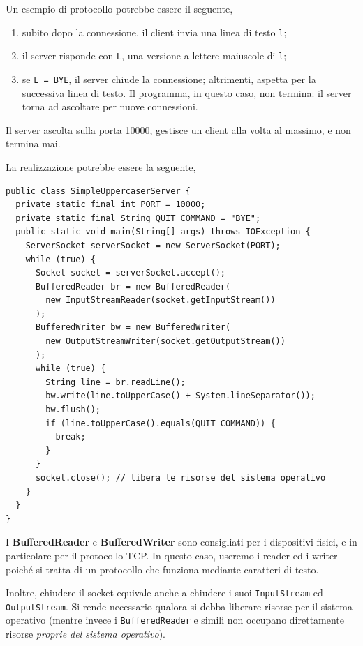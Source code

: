 \documentclass[\fontsizeclass,twocolumn]{\classname}
\theoremstyle{definition}
\theoremstyle{definition}
\begin{document}
Un esempio di protocollo potrebbe essere il seguente,

\begin{enumerate}
    \item subito dopo la connessione, il client invia una linea di testo
        \texttt{l};
    \item il server risponde con \texttt{L}, una versione a lettere maiuscole
        di \texttt{l};
    \item se \texttt{L = BYE}, il server chiude la connessione; altrimenti,
        aspetta per la successiva linea di testo. Il programma, in questo caso,
        non termina: il server torna ad ascoltare per nuove connessioni.
\end{enumerate}

Il server ascolta sulla porta 10000, gestisce un client alla volta al massimo,
e non termina mai.

La realizzazione potrebbe essere la seguente,

\begin{lstlisting}
public class SimpleUppercaserServer {
  private static final int PORT = 10000;
  private static final String QUIT_COMMAND = "BYE";
  public static void main(String[] args) throws IOException {
    ServerSocket serverSocket = new ServerSocket(PORT);
    while (true) {
      Socket socket = serverSocket.accept();
      BufferedReader br = new BufferedReader(
        new InputStreamReader(socket.getInputStream())
      );
      BufferedWriter bw = new BufferedWriter(
        new OutputStreamWriter(socket.getOutputStream())
      );
      while (true) {
        String line = br.readLine();
        bw.write(line.toUpperCase() + System.lineSeparator());
        bw.flush();
        if (line.toUpperCase().equals(QUIT_COMMAND)) {          
          break;
        }
      }
      socket.close(); // libera le risorse del sistema operativo
    }
  }
}
\end{lstlisting}

I \textbf{BufferedReader} e \textbf{BufferedWriter} sono consigliati per i
dispositivi fisici, e in particolare per il protocollo TCP. In questo caso,
useremo i reader ed i writer poiché si tratta di un protocollo che funziona
mediante caratteri di testo.

Inoltre, chiudere il socket equivale anche a chiudere i suoi
\texttt{Input\-Stream} ed \texttt{Output\-Stream}. Si rende necessario qualora si
debba liberare risorse per il sistema operativo (mentre invece i
\texttt{BufferedReader} e simili non occupano direttamente risorse
\emph{proprie del sistema operativo}).
\end{document}
